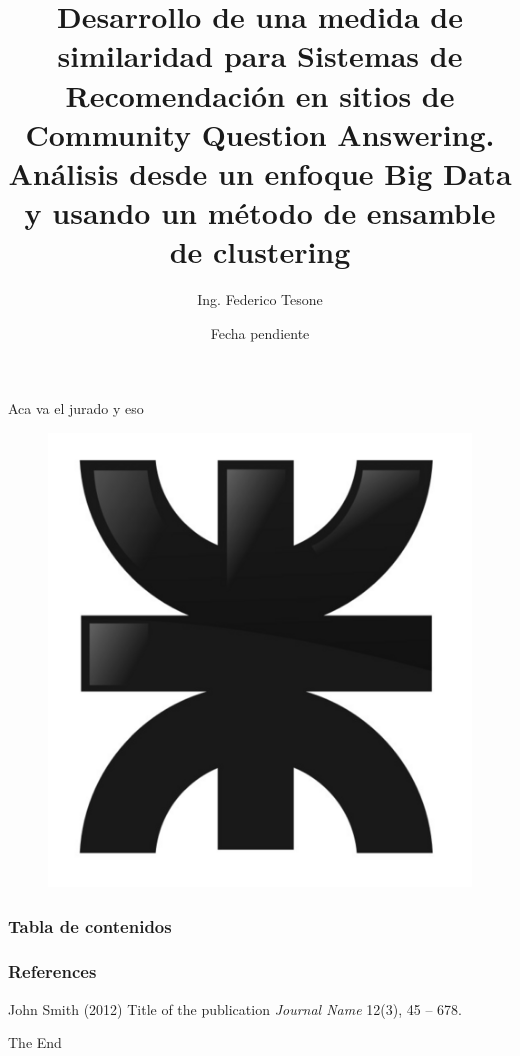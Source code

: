 \documentclass{beamer}
\title[]{Desarrollo de una medida de similaridad para Sistemas de Recomendación en sitios de Community Question Answering. Análisis desde un enfoque Big Data y usando un método de ensamble de clustering} %
\author{Ing. Federico Tesone} %
\institute[UTN] %
{
	Universidad Tecnológica Nacional (FRR) \\ %
	\medskip
}
\date{Fecha pendiente} %
\begin{document}
	\begin{frame}
		\titlepage
	\end{frame}

	\begin{frame}
	Aca va el jurado y eso

		\begin{figure}
			\includegraphics[width=0.1\linewidth]{../imagenes/portada/logoUTN.png}
		\end{figure}
	\end{frame}

	\begin{frame}[allowframebreaks]
		\frametitle{Tabla de contenidos}
		\scriptsize
		\tableofcontents
	\end{frame}

	
	
	
	
	
	
	

	\begin{frame}
		\frametitle{References}
		\footnotesize{
			\begin{thebibliography}{99} %
				 John Smith (2012)
				\newblock Title of the publication
				\newblock \emph{Journal Name} 12(3), 45 -- 678.
			\end{thebibliography}
		}
	\end{frame}

	\begin{frame}
		\Huge{\centerline{The End}}
	\end{frame}
\end{document}
